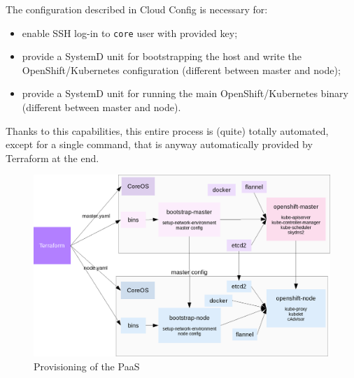 The configuration described in Cloud Config is necessary for:
\begin{itemize}
\item enable SSH log-in to \texttt{core} user with provided key;
\item provide a SystemD unit for bootstrapping the host and write the OpenShift/Kubernetes configuration (different between master and node);
\item provide a SystemD unit for running the main OpenShift/Kubernetes binary (different between master and node).
\end{itemize}

Thanks to this capabilities, this entire process is (quite) totally automated, except for a single command, that is anyway automatically provided by Terraform at the end.

\begin{figure}[htbp]
\centering
\includegraphics{media/ch4-bootstrap.png}
\caption{Provisioning of the PaaS}
\end{figure}